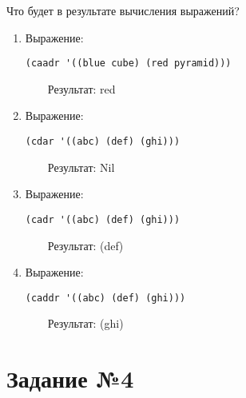 Что будет в результате вычисления выражений?

\begin{enumerate}
    \item Выражение:

        \vspace{4mm}
        \hfill
        \begin{minipage}{0.81\linewidth}
        \begin{lstlisting}
(caadr '((blue cube) (red pyramid)))
        \end{lstlisting}
        \end{minipage}

    ~~~~Результат: red

    \item Выражение:

        \vspace{4mm}
        \hfill
        \begin{minipage}{0.81\linewidth}
        \begin{lstlisting}
(cdar '((abc) (def) (ghi)))
        \end{lstlisting}
        \end{minipage}

    ~~~~Результат: Nil

    \item Выражение:

        \vspace{4mm}
        \hfill
        \begin{minipage}{0.81\linewidth}
        \begin{lstlisting}
(cadr '((abc) (def) (ghi)))
        \end{lstlisting}
        \end{minipage}

    ~~~~Результат: (def)

    \item Выражение:

        \vspace{4mm}
        \hfill
        \begin{minipage}{0.81\linewidth}
        \begin{lstlisting}
(caddr '((abc) (def) (ghi)))
        \end{lstlisting}
        \end{minipage}

    ~~~~Результат: (ghi)
\end{enumerate}

\section{Задание №4}


